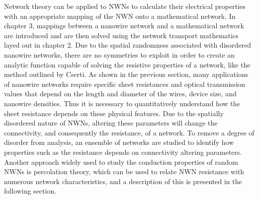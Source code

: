 Network theory can be applied to NWNs to calculate their electrical properties with an appropriate mapping of the NWN onto a mathematical network. In chapter 3, mappings between a nanowire network and a mathematical network are introduced and are then solved using the network transport mathematics layed out in chapter 2. Due to the spatial randomness associated with disordered nanowire networks, there are no symmetries to exploit in order to create an analytic function capable of solving the resistive properties of a network, like the method outlined by Cserti\cite{cserti2000}. As shown in the previous section, many applications of nanowire networks require specific sheet resistances and optical transmission values that depend on the length and diameter of the wires, device size, and nanowire densities. Thus it is necessary to quantitatively understand how the sheet resistance depends on these physical features. Due to the spatially disordered nature of NWNs, altering these parameters will change the connectivity, and consequently the resistance, of a network\cite{ocallaco2016}. To remove a degree of disorder from analysis, an ensemble of networks are studied to identify how properties such as the resistance depends on connectivity altering parameters\cite{ocallaco2016,pike1974}. Another approach widely used to study the conduction properties of random NWNs is percolation theory\cite{pike1974}, which can be used to relate NWN resistance with numerous network characteristics, and a description of this is presented in the following section. 

